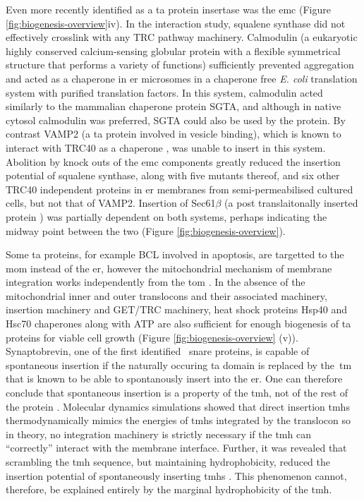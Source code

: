 Even more recently identified as a \gls{ta} protein insertase was the \gls{emc} \cite{Guna2018a} (Figure \ref{fig:biogenesis-overview}iv).
In the interaction study, squalene synthase did not effectively crosslink with any TRC pathway machinery.
Calmodulin (a eukaryotic highly conserved calcium\--sensing globular protein with a flexible symmetrical structure that performs a variety of functions) sufficiently prevented aggregation and acted as a chaperone in \gls{er} microsomes in a chaperone free \textit{E. coli} translation system with purified translation factors.
In this system, calmodulin acted similarly to the mammalian chaperone protein SGTA, and although in native cytosol calmodulin was preferred, SGTA could also be used by the protein.
By contrast VAMP2 (a \gls{ta} protein involved in vesicle binding), which is known to interact with TRC40 as a chaperone \cite{Shao2017}, was unable to insert in this system.
Abolition by knock outs of the \gls{emc} components greatly reduced the insertion potential of squalene synthase, along with five mutants thereof, and six other TRC40 independent proteins in \gls{er} membranes from semi-permeabilised cultured cells, but not that of VAMP2.
Insertion of Sec61$\beta$ (a post translaitonally inserted protein ) was partially dependent on both systems, perhaps indicating the midway point between the two \cite{Guna2018a} (Figure \ref{fig:biogenesis-overview}).

Some \gls{ta} proteins, for example BCL involved in apoptosis, are targetted to the \gls{mom} instead of the \gls{er}, however the mitochondrial mechanism of membrane integration works independently from the \gls{tom} \cite{Setoguchi2006, Kemper2008}.
In the absence of the mitochondrial inner and outer translocons and their associated machinery, insertion machinery and GET/TRC machinery, heat shock proteins Hsp40 and Hsc70 chaperones along with ATP are also sufficient for enough biogenesis of \gls{ta} proteins for viable cell growth \cite{Rabu2008, Rabu2009, Ngosuwan2003, Colombo2009, Kemper2008, Meineke2008, Setoguchi2006, Kemper2008} (Figure \ref{fig:biogenesis-overview} (v)).
Synaptobrevin, one of the first identified~ \gls{snare} proteins, is capable of spontaneous insertion if the naturally occuring \gls{ta} domain is replaced by the~\gls{tm} that is known to be able to spontanously insert into the \gls{er}.
One can therefore conclude that spontaneous insertion is a property of the \gls{tmh}, not of the rest of the protein \cite{Nordlund2014}.
Molecular dynamics simulations showed that direct insertion \gls{tmh}s thermodynamically mimics the energies of \gls{tmh}s integrated by the translocon \cite{Ulmschneider2014} so in theory, no integration machinery is strictly necessary if the \gls{tmh} can ``correctly'' interact with the membrane interface.
Further, it was revealed that scrambling the \gls{tmh} sequence, but maintaining hydrophobicity, reduced the insertion potential of spontaneously inserting \gls{tmh}s \cite{Brambillasca2006}.
This phenomenon cannot, therefore, be explained entirely by the marginal hydrophobicity of the \gls{tmh}.

